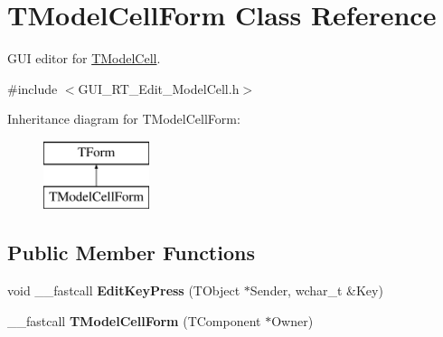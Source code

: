 \hypertarget{class_t_model_cell_form}{\section{T\+Model\+Cell\+Form Class Reference}
\label{class_t_model_cell_form}
}


G\+U\+I editor for \hyperlink{class_t_model_cell}{T\+Model\+Cell}.  




{\ttfamily \#include $<$G\+U\+I\+\_\+\+R\+T\+\_\+\+Edit\+\_\+\+Model\+Cell.\+h$>$}

Inheritance diagram for T\+Model\+Cell\+Form\+:\begin{figure}[H]
\begin{center}
\leavevmode
\includegraphics[height=2.000000cm]{class_t_model_cell_form}
\end{center}
\end{figure}
\subsection*{Public Member Functions}
\begin{DoxyCompactItemize}
\item 
\hypertarget{class_t_model_cell_form_a93464aa737f44f3f044bc9f58de01b6f}{void \+\_\+\+\_\+fastcall {\bfseries Edit\+Key\+Press} (T\+Object $\ast$Sender, wchar\+\_\+t \&Key)}\label{class_t_model_cell_form_a93464aa737f44f3f044bc9f58de01b6f}

\item 
\hypertarget{class_t_model_cell_form_a8126b0caa81411a38b99b1b1bbf66533}{\+\_\+\+\_\+fastcall {\bfseries T\+Model\+Cell\+Form} (T\+Component $\ast$Owner)}\label{class_t_model_cell_form_a8126b0caa81411a38b99b1b1bbf66533}

\end{DoxyCompactItemize}
